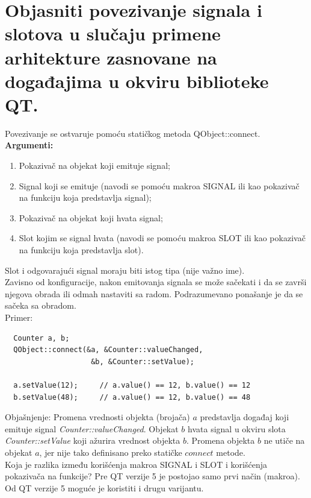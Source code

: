\documentclass[a4paper]{article}
\begin{document}
\section{Objasniti povezivanje signala i slotova u slučaju primene arhitekture 
         zasnovane na događajima u okviru biblioteke QT.}
  Povezivanje se ostvaruje pomoću statičkog metoda QObject::connect. \\
  \textbf{Argumenti:}
  \begin{enumerate}
    \item Pokazivač na objekat koji emituje signal;
    \item Signal koji se emituje (navodi se pomoću makroa SIGNAL
          ili kao pokazivač na funkciju koja predstavlja signal);
    \item Pokazivač na objekat koji hvata signal;
    \item Slot kojim se signal hvata (navodi se pomoću makroa SLOT
          ili kao pokazivač na funkciju koja predstavlja slot).
  \end{enumerate}
  Slot i odgovarajući signal moraju biti istog tipa (nije važno ime).\\
  Zavisno od konfiguracije, nakon emitovanja signala se može sačekati i da se završi njegova obrada 
  ili odmah nastaviti sa radom. Podrazumevano ponašanje je da se sačeka sa obradom.\\
  Primer:
  \begin{lstlisting}
  Counter a, b;
  QObject::connect(&a, &Counter::valueChanged,
                    &b, &Counter::setValue);

  a.setValue(12);     // a.value() == 12, b.value() == 12
  b.setValue(48);     // a.value() == 12, b.value() == 48\end{lstlisting}
  Objašnjenje: Promena vrednosti objekta (brojača) $a$ predstavlja događaj koji emituje signal
  \textit{Counter::valueChanged}. Objekat $b$ hvata signal u okviru slota \textit{Counter::setValue}
  koji ažurira vrednost objekta $b$. Promena objekta $b$ ne utiče na objekat $a$, jer nije tako
  definisano preko statičke $connect$ metode.\\

  Koja je razlika između korišćenja makroa SIGNAL i SLOT i korišćenja pokazivača
  na funkcije? Pre QT verzije 5 je postojao samo prvi način (makroa). Od QT verzije 5 moguće
  je koristiti i drugu varijantu.
  
\end{document}
